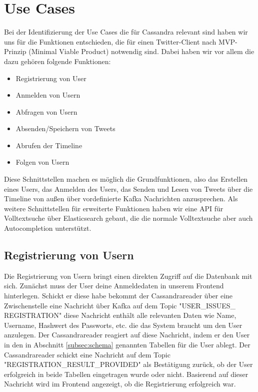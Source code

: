 \section{Use Cases}
\label{sec:usecase}
Bei der Identifizierung der Use Cases die für Cassandra relevant sind haben wir uns für die Funktionen entschieden, die für einen Twitter-Client nach MVP-Prinzip (Minimal Viable Product) notwendig sind. Dabei haben wir vor allem die dazu gehören folgende Funktionen:
\begin{itemize}
	\item Registrierung von User
	\item Anmelden von Usern
	\item Abfragen von Usern
	\item Absenden/Speichern von Tweets
	\item Abrufen der Timeline
	\item Folgen von Usern
\end{itemize}
Diese Schnittstellen machen es möglich die Grundfunktionen, also das Erstellen eines Users, das Anmelden des Users, das Senden und Lesen von Tweets über die Timeline von außen über vordefinierte Kafka Nachrichten anzusprechen.
Als weitere Schnittstellen für erweiterte Funktionen haben wir eine API für Volltextsuche über Elasticsearch gebaut, die die normale Volltextsuche aber auch Autocompletion unterstützt.\\

\subsection{Registrierung von Usern}
Die Registrierung von Usern bringt einen direkten Zugriff auf die Datenbank mit sich. Zunächst muss der User deine Anmeldedaten in unserem Frontend hinterlegen. Schickt er diese habe bekommt der Cassandrareader über eine Zwischenstelle eine Nachricht über Kafka auf dem Topic "USER\_ISSUES\_ REGISTRATION" diese Nachricht enthält alle relevanten Daten wie Name, Username, Hashwert des Passworts, etc. die das System braucht um den User anzulegen. Der Cassandrareader reagiert auf diese Nachricht, indem er den User in den in Abschnitt \ref{subsec:schema} genannten Tabellen für die User ablegt. Der Cassandrareader schickt eine Nachricht auf dem Topic "REGISTRATION\_RESULT\_PROVIDED" als Bestätigung zurück, ob der User erfolgreich in beide Tabellen eingetragen wurde oder nicht. Basierend auf dieser Nachricht wird im Frontend angezeigt, ob die Registrierung erfolgreich war.

